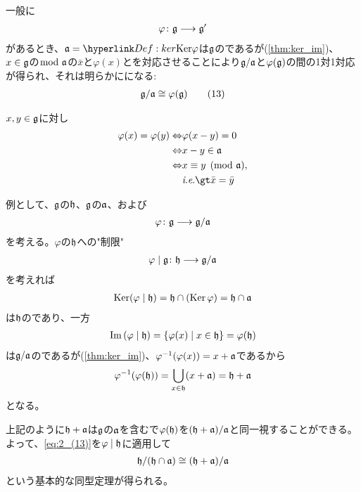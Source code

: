 \documentclass[../main]{subfiles}
\begin{document}
\begin{theorem}
  一般に{}
  \begin{align*}
    \varphi\colon\mathfrak{g}\longrightarrow\mathfrak{g}^{\prime}
  \end{align*}
  があるとき、$\a=\hlin{Def:ker}{\Ker}{\varphi}$は$\mathfrak{g}$の{}であるが(\cref{thm:ker_im})、
  $x\in\mathfrak{g}$の$\bmod{\;\mathfrak{a}}$の{}$\bar{x}$と$\varphi(x)$とを対応させることにより$\mathfrak{g}/\mathfrak{a}$と$\varphi(\mathfrak{g})$の間の1対1対応が得られ、それは明らかに{}になる:
  \begin{align*}
    \mathfrak{g}/\mathfrak{a}\cong\varphi(\mathfrak{g})\tag{13}\label{eq:2_(13)}
  \end{align*}
\end{theorem}
\begin{Proof}
  $x,y\in\mathfrak{g}$に対し
  \begin{align*}
    \varphi(x)=\varphi(y) 
    \Leftrightarrow& \varphi(x-y)=0\\
    \Leftrightarrow& x-y\in\a\\
    \Leftrightarrow& x\equiv y \pmod{\a},\\
    &\ie\bar{x}=\bar{y}
  \end{align*}
\end{Proof}

\begin{remark}
  例として、$\mathfrak{g}$の{}$\mathfrak{h}$、$\mathfrak{g}$の{}$\mathfrak{a}$、および{}
  \begin{align*}
    \varphi\colon\mathfrak{g}\longrightarrow\mathfrak{g}/\mathfrak{a}
  \end{align*}
  を考える。$\varphi$の$\mathfrak{h}$への"制限"
  \begin{align*}
    \varphi\mid\mathfrak{g}\colon \mathfrak{h}\longrightarrow\mathfrak{g}/\mathfrak{a}
  \end{align*}
  を考えれば
  \begin{align*}
    \operatorname{Ker}(\varphi\mid\mathfrak{h})=\mathfrak{h}\cap\qty(\operatorname{Ker}\varphi)=\mathfrak{h}\cap\mathfrak{a}
  \end{align*}
  は$\mathfrak{h}$の{}であり、一方
  \begin{align*}
    \Im\qty(\varphi\mid\mathfrak{h})=\qty{\varphi(x)\mid x\in\mathfrak{h}}=\varphi(\mathfrak{h})
  \end{align*}
  は$\mathfrak{g}/\mathfrak{a}$の{}であるが(\cref{thm:ker_im})、$\varphi^{-1}(\varphi(x))=x+\mathfrak{a}$であるから
  \begin{align*}
    \varphi^{-1}\qty(\varphi(\mathfrak{h}))=\bigcup_{x\in\mathfrak{h}}(x+\mathfrak{a})=\mathfrak{h}+\mathfrak{a}
  \end{align*}
  となる。
\end{remark}



\begin{remark}
  上記のように$\mathfrak{h}+\mathfrak{a}$は$\mathfrak{g}$の$\mathfrak{a}$を含む{}で$\varphi(\mathfrak{h})$を$(\mathfrak{h}+\mathfrak{a})/\mathfrak{a}$と同一視することができる。よって、\eqref{eq:2_(13)}を$\varphi\mid\mathfrak{h}$に適用して
  \begin{align*}
    \mathfrak{h}/(\mathfrak{h}\cap\mathfrak{a})\cong(\mathfrak{h}+\mathfrak{a})/\mathfrak{a}
  \end{align*}
  という基本的な同型定理が得られる。
\end{remark}
\end{document}
